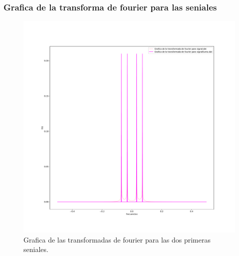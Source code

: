 \documentclass[11pt,letterpaper]{exam}
\begin{document}
\subsubsection{Grafica de la transforma de fourier para las seniales}
\begin{figure}[H]
    \centering
    \includegraphics[width=1.1\textwidth]{Fourier_trans.pdf}
    \caption{Grafica de las transformadas de fourier para las dos primeras seniales.}
    \label{fig:my_label}
\end{figure}
\end{document}
